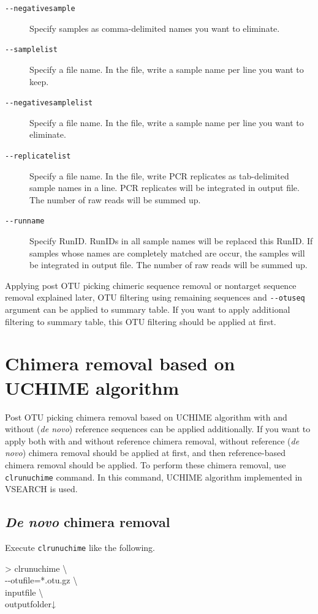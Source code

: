 \documentclass[titlepage,10pt,a4paper,english]{jsbook}
\newenvironment{cmd}{\begin{oframed}\raggedright\ttfamily\footnotesize\setlength{\baselineskip}{1.4em}}{\end{oframed}\vspace{-1em}}
\begin{document}
\begin{description}
\item[\texttt{{-}{-}negativesample}] Specify samples as comma-delimited names you want to eliminate.
\item[\texttt{{-}{-}samplelist}] Specify a file name.
In the file, write a sample name per line you want to keep.
\item[\texttt{{-}{-}negativesamplelist}] Specify a file name.
In the file, write a sample name per line you want to eliminate.
\item[\texttt{{-}{-}replicatelist}] Specify a file name.
In the file, write PCR replicates as tab-delimited sample names in a line.
PCR replicates will be integrated in output file.
The number of raw reads will be summed up.
\item[\texttt{{-}{-}runname}] Specify RunID.
RunIDs in all sample names will be replaced this RunID.
If samples whose names are completely matched are occur, the samples will be integrated in output file.
The number of raw reads will be summed up.
\end{description}

Applying post OTU picking chimeric sequence removal or nontarget sequence removal explained later, OTU filtering using remaining sequences and \texttt{{-}{-}otuseq} argument can be applied to summary table.
If you want to apply additional filtering to summary table, this OTU filtering should be applied at first.

\section{Chimera removal based on UCHIME algorithm}

Post OTU picking chimera removal based on UCHIME algorithm with and without (\textit{de novo}) reference sequences can be applied additionally.
If you want to apply both with and without reference chimera removal, without reference (\textit{de novo}) chimera removal should be applied at first, and then reference-based chimera removal should be applied.
To perform these chimera removal, use \texttt{clrunuchime} command.
In this command, UCHIME algorithm implemented in VSEARCH is used.

\subsection{\textit{De novo} chimera removal}

Execute \texttt{clrunuchime} like the following.

\begin{cmd}
{\textgreater} clrunuchime {\textbackslash}\\
{-}{-}otufile=*.otu.gz {\textbackslash}\\
inputfile {\textbackslash}\\
outputfolder↓
\end{cmd}
\end{document}
